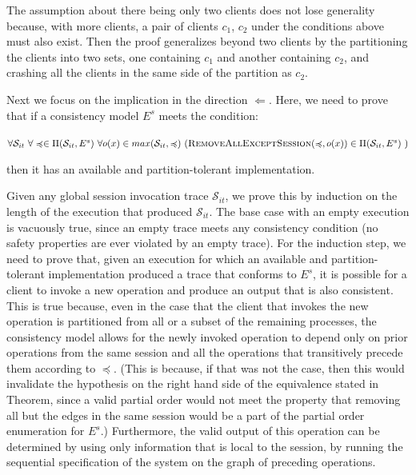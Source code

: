 \documentclass[journal,compsoc]{IEEEtran}
\begin{document}
The assumption about there being only two clients does not lose generality because, with more clients, a pair of clients $c_1$, $c_2$ under the conditions above must also exist. Then the proof generalizes beyond two clients by the partitioning the clients into two sets, one containing $c_1$ and another containing $c_2$, and crashing all the clients in the same side of the partition as $c_2$.

Next we focus on the implication in the direction $\Leftarrow$. Here, we need to prove that if a consistency model $E^s$ meets the condition:

\noindent $\forall \mathcal{S}_{it} ~ \forall \preccurlyeq \in \Pi(\mathcal{S}_{it},E^s) ~ \forall o(x) \in max(\mathcal{S}_{it}, \preccurlyeq) ~ (\textsc{RemoveAllExceptSession}(\preccurlyeq,o(x)) \in \Pi(\mathcal{S}_{it},E^s) ~ ) $

then it has an available and partition-tolerant implementation. 



Given any global session invocation trace $\mathcal{S}_{it}$, we prove this by induction on the length of the execution that produced $\mathcal{S}_{it}$. The base case with an empty execution is vacuously true, since an empty trace meets any consistency condition (no safety properties are ever violated by an empty trace). For the induction step, we need to prove that, given an execution for which an available and partition-tolerant implementation produced a trace that conforms to $E^s$, it is possible for a client to invoke a new operation and produce an output that is also consistent. This is true because, even in the case that the client that invokes the new operation is partitioned from all or a subset of the remaining processes, the consistency model allows for the newly invoked operation to depend only on prior operations from the same session and all the operations that transitively precede them according to $\preccurlyeq$. (This is because, if that was not the case, then this would invalidate the hypothesis on the right hand side of the equivalence stated in Theorem, since a valid partial order would not meet the property that removing all but the edges in the same session would be a part of the partial order enumeration for $E^s$.)  Furthermore, the valid output of this operation can be determined by using only information that is local to the session, by running the sequential specification of the system on the graph of preceding operations.

 
\end{document}
